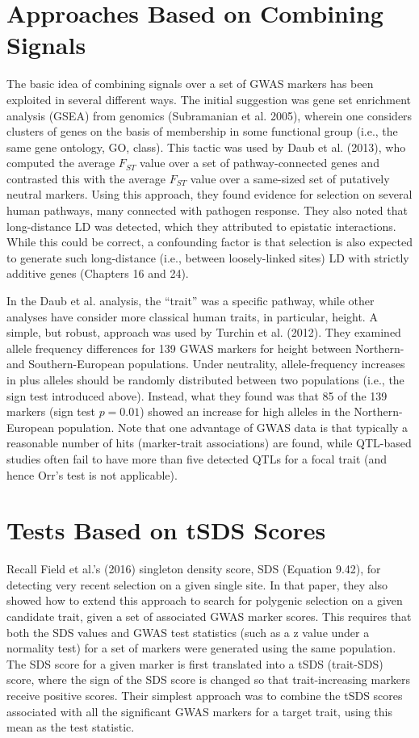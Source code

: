 \documentclass{article}
\begin{document}
\section{Approaches Based on Combining Signals}
The basic idea of combining signals over a set of GWAS markers has been exploited in several different ways. The initial suggestion was gene set enrichment analysis (GSEA) from genomics (Subramanian et al. 2005), wherein one considers clusters of genes on the basis of membership in some functional group (i.e., the same gene ontology, GO, class). This tactic was used by Daub et al. (2013), who computed the average  $ F_{ST} $ value over a set of pathway-connected genes and contrasted this with the average  $ F_{ST} $ value over a same-sized set of putatively neutral markers. Using this approach, they found evidence for selection on several human pathways, many connected with pathogen response. They also noted that long-distance LD was detected, which they attributed to epistatic interactions. While this could be correct, a confounding factor is that selection is also expected to generate such long-distance (i.e., between loosely-linked sites) LD with strictly additive genes (Chapters 16 and 24).

In the Daub et al. analysis, the “trait” was a specific pathway, while other analyses have consider more classical human traits, in particular, height. A simple, but robust, approach was used by Turchin et al. (2012). They examined allele frequency differences for 139 GWAS markers for height between Northern- and Southern-European populations. Under neutrality, allele-frequency increases in plus alleles should be randomly distributed between two populations (i.e., the sign test introduced above). Instead, what they found was that 85 of the 139 markers (sign test  $ p = 0.01 $) showed an increase for high alleles in the Northern-European population. Note that one advantage of GWAS data is that typically a reasonable number of hits (marker-trait associations) are found, while QTL-based studies often fail to have more than five detected QTLs for a focal trait (and hence Orr’s test is not applicable).

\section{Tests Based on tSDS Scores}
Recall Field et al.'s (2016) singleton density score, SDS (Equation 9.42), for detecting very recent selection on a given single site. In that paper, they also showed how to extend this approach to search for polygenic selection on a given candidate trait, given a set of associated GWAS marker scores. This requires that both the SDS values and GWAS test statistics (such as a z value under a normality test) for a set of markers were generated using the same population. The SDS score for a given marker is first translated into a tSDS (trait-SDS) score, where the sign of the SDS score is changed so that trait-increasing markers receive positive scores. Their simplest approach was to combine the tSDS scores associated with all the significant GWAS markers for a target trait, using this mean as the test statistic.
\end{document}
